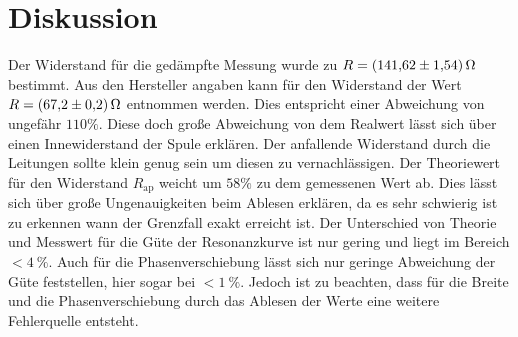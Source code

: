 \section{Diskussion}
\label{sec:Diskussion}
Der Widerstand für die gedämpfte Messung wurde zu $R=\SI{141.62\pm1.54}{\ohm}$ bestimmt. Aus den Hersteller angaben kann für den Widerstand der Wert $R=\SI{67.2\pm0.2}{\ohm}$ entnommen werden.
Dies entspricht einer Abweichung von ungefähr $110\%$. Diese doch große Abweichung von dem Realwert lässt sich über einen Innewiderstand der Spule erklären.
Der anfallende Widerstand durch die Leitungen sollte klein genug sein um diesen zu vernachlässigen.
Der Theoriewert für den Widerstand $R_\text{ap}$ weicht um $58\%$ zu dem gemessenen Wert ab. Dies lässt sich über große Ungenauigkeiten beim Ablesen erklären, da es sehr schwierig ist zu erkennen wann der Grenzfall exakt erreicht ist.
Der Unterschied von Theorie und Messwert für die Güte der Resonanzkurve ist nur gering und liegt im Bereich $<\SI{4}{\percent}$.
Auch für die Phasenverschiebung lässt sich nur geringe Abweichung der Güte feststellen, hier sogar bei $<\SI{1}{\percent}$.
Jedoch ist zu beachten, dass für die Breite und die Phasenverschiebung durch das Ablesen der Werte eine weitere Fehlerquelle entsteht. 
